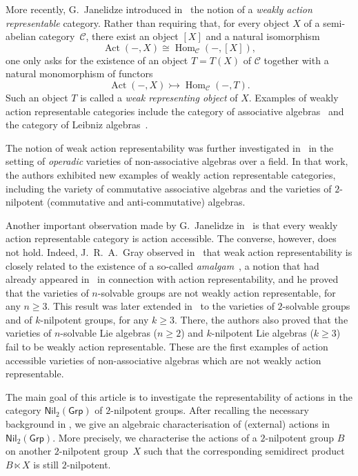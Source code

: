 \documentclass[reqno,hidelinks,a4paper]{amsart}
\theoremstyle{plain}
\theoremstyle{definition}
\theoremstyle{remark}
\numberwithin{equation}{section}
\newcommand{\C}{\ensuremath{\mathcal{C}}}
\DeclareMathOperator{\Act}{Act}
\DeclareMathOperator{\Hom}{Hom}
\newcommand{\Grp}{\ensuremath{\mathsf{Grp}}}
\newcommand{\Nil}{\ensuremath{\mathsf{Nil}}}
\begin{document}
More recently, G.~Janelidze introduced in~\cite{WRA} the notion of a \emph{weakly action representable} category. Rather than requiring that, for every object \(X\) of a semi-abelian category~\(\C\), there exist an object \([X]\) and a natural isomorphism
\[
    \Act(-,X)\cong\Hom_{\C}(-,[X]),
\]
one only asks for the existence of an object \(T=T(X)\) of \(\C\) together with a natural monomorphism of functors
\[
    \Act(-,X)\rightarrowtail \Hom_{\C}(-,T).
\]
Such an object \(T\) is called a \emph{weak representing object} of \(X\). Examples of weakly action representable categories include the category of associative algebras~\cite{WRA} and the category of Leibniz algebras~\cite{CigoliManciniMetere}.

The notion of weak action representability was further investigated in~\cite{WRAAlg} in the setting of \emph{operadic} varieties of non-associative algebras over a field. In that work, the authors exhibited new examples of weakly action representable categories, including the variety of commutative associative algebras and the varieties of \(2\)-nilpotent (commutative and anti-commutative) algebras.

Another important observation made by  G.~Janelidze in~\cite{WRA} is that every weakly action representable category is action accessible. The converse, however, does not hold. Indeed, J.~R.~A.~Gray observed in~\cite[Proposition~2.2]{Gray} that weak action representability is closely related to the existence of a so-called \emph{amalgam}~\cite{kiss}, a notion that had already appeared in~\cite{BJK2} in connection with action representability, and he proved that the varieties of \(n\)-solvable groups are not weakly action representable, for any \(n \geq 3\). This result was later extended in~\cite{XabiMancini} to the varieties of \(2\)-solvable groups and of \(k\)-nilpotent groups, for any \(k \geq 3\). There, the authors also proved that the varieties of \(n\)-solvable Lie algebras (\(n \geq 2\)) and \(k\)-nilpotent Lie algebras (\(k \geq 3\)) fail to be weakly action representable. These are the first examples of action accessible varieties of non-associative algebras which are not weakly action representable.

The main goal of this article is to investigate the representability of actions in the category \(\Nil_2(\Grp)\) of \(2\)-nilpotent groups. After recalling the necessary background in , we give an algebraic characterisation of (external) actions in \(\Nil_2(\Grp)\). More precisely, we characterise the actions of a \(2\)-nilpotent group \(B\) on another \(2\)-nilpotent group~\(X\) such that the corresponding semidirect product \(B \ltimes X\) is still \(2\)-nilpotent.
\end{document}
